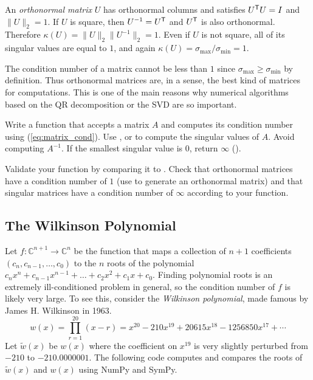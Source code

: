 \begin{info} %
An \emph{orthonormal matrix} $U$ has orthonormal columns and satisfies $U^{\mathsf T} U = I$ and $\|U\|_2 = 1$.
If $U$ is square, then $U^{-1} = U^{\mathsf T}$ and $U^{\mathsf T}$ is also orthonormal.
Therefore $\kappa(U) = \|U\|_2\|U^{-1}\|_2 = 1$.
Even if $U$ is not square, all of its singular values are equal to $1$, and again $\kappa(U) = \sigma_{\max} / \sigma_{\min} = 1$.

The condition number of a matrix cannot be less than $1$ since $\sigma_{\max} \ge \sigma_{\min}$ by definition.
Thus orthonormal matrices are, in a sense, the best kind of matrices for computations.
This is one of the main reasons why numerical algorithms based on the QR decomposition or the SVD are so important.
\end{info}

\begin{problem} %
Write a function that accepts a matrix $A$ and computes its condition number using (\ref{eq:matrix_cond}).
Use , or  to compute the singular values of $A$.
Avoid computing $A^{-1}$.
If the smallest singular value is $0$, return $\infty$ ().

Validate your function by comparing it to .
Check that orthonormal matrices have a condition number of $1$ (use  to generate an orthonormal matrix) and that singular matrices have a condition number of $\infty$ according to your function.
\end{problem}


\subsection*{The Wilkinson Polynomial} %

Let $f:\mathbb{C}^{n+1} \rightarrow \mathbb{C}^n$ be the function that maps a collection of $n+1$ coefficients $(c_n, c_{n-1}, \ldots, c_0)$ to the $n$ roots of the polynomial $c_nx^n+c_{n-1}x^{n-1}+\ldots+c_2x^2+c_1x+c_0$.
Finding polynomial roots is an extremely ill-conditioned problem in general, so the condition number of $f$ is likely very large.
To see this, consider the \emph{Wilkinson polynomial}, made famous by James H. Wilkinson in 1963.
\[
w(x) = \prod_{r=1}^{20}(x-r) = x^{20} - 210x^{19} + 20615x^{18} - 1256850x^{17} + \cdots
\]
Let $\tilde{w}(x)$ be $w(x)$ where the coefficient on $x^{19}$ is very slightly perturbed from $-210$ to $-210.0000001$.
The following code computes and compares the roots of $\tilde{w}(x)$ and $w(x)$ using NumPy and SymPy.

